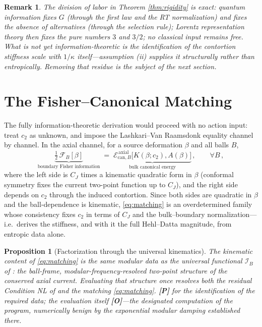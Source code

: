 \documentclass[11pt]{article}
\newtheorem{proposition}[theorem]{Proposition}
\newtheorem{remark}[theorem]{Remark}
\theoremstyle{definition}
\newcommand{\pP}{\textbf{[P]}}
\newcommand{\pO}{\textbf{[O]}}
\begin{document}
\begin{remark}
The division of labor in Theorem \ref{thm:rigidity} is exact: quantum
information fixes $G$ (through the first law and the RT normalization)
and fixes the \emph{absence of alternatives} (through the selection
rule); Lorentz representation theory then fixes the pure numbers $3$ and
$3/2$; no classical input remains free. What is \emph{not} yet
information-theoretic is the identification of the contortion stiffness
scale with $1/\kappa$ itself---assumption (ii) supplies it structurally
rather than entropically. Removing that residue is the subject of the
next section.
\end{remark}

\section{The Fisher--Canonical Matching}
\label{sec:fisher}

The fully information-theoretic derivation would proceed with no action
input: treat $c_2$ as unknown, and impose the Lashkari--Van Raamsdonk
equality channel by channel. In the axial channel, for a source
deformation $\beta$ and all balls $B$,
\begin{equation}
\underbrace{\tfrac12\,\mathcal F_B[\beta]}_{\text{boundary Fisher
information}}
\;=\;
\underbrace{\mathcal E^{\,\mathrm{axial}}_{\mathrm{can},B}
\big[K(\beta;c_2),A(\beta)\big]}_{\text{bulk canonical energy}}\,,
\qquad\forall B\,,
\label{eq:matching}
\end{equation}
where the left side is $C_J$ times a kinematic quadratic form in $\beta$
(conformal symmetry fixes the current two-point function up to $C_J$),
and the right side depends on $c_2$ through the induced contortion. Since
both sides are quadratic in $\beta$ and the ball-dependence is kinematic,
\eqref{eq:matching} is an overdetermined family whose consistency fixes
$c_2$ in terms of $C_J$ and the bulk--boundary normalization---i.e.\
derives the stiffness, and with it the full Hehl--Datta magnitude, from
entropic data alone.

\begin{proposition}[Factorization through the universal kinematics]
The kinematic content of \eqref{eq:matching} is the same modular data as
the universal functional $\mathcal I_B$ of \cite{McGwier2026d}: the
ball-frame, modular-frequency-resolved two-point structure of the
conserved axial current. Evaluating that structure once resolves both the
residual Condition NL of \cite{McGwier2026d} and the matching
\eqref{eq:matching}. \pP{} for the identification of the required data;
the evaluation itself \pO{}---the designated computation of the program,
numerically benign by the exponential modular damping established there.
\end{proposition}
\end{document}
